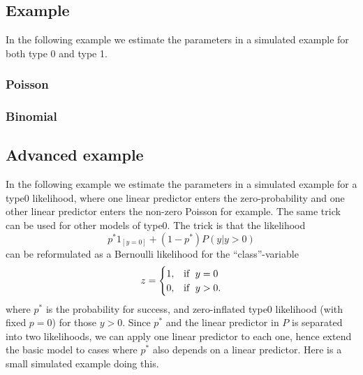 \documentclass[a4paper,11pt]{article}
\begin{document}
\subsection*{Example}

In the following example we estimate the parameters in a simulated
example for both type 0 and type 1.
\subsubsection*{Poisson}



\subsubsection*{Binomial}



\clearpage

\subsection*{Advanced example}

In the following example we estimate the parameters in a simulated
example for a type0 likelihood, where one linear predictor enters the
zero-probability and one other linear predictor enters the non-zero
Poisson for example. The same trick can be used for other models of
type0.  The trick is that the likelihood
\begin{displaymath}
    p^{*} 1_{[y=0]} + (1-p^{*}) P(y | y > 0)
\end{displaymath}
can be reformulated as a Bernoulli likelihood for the
``class''-variable
\begin{displaymath}
    z =
    \begin{cases}
        1, & \text{if\; }y=0\\
        0, & \text{if\; }y > 0.
    \end{cases}
\end{displaymath}
where $p^{*}$ is the probability for success, and zero-inflated type0
likelihood (with fixed $p = 0$) for those $y > 0$. Since $p^{*}$ and
the linear predictor in $P$ is separated into two likelihoods, we can
apply one linear predictor to each one, hence extend the basic model
to cases where $p^{*}$ also depends on a linear predictor.  Here is a
small simulated example doing this.

\end{document}
